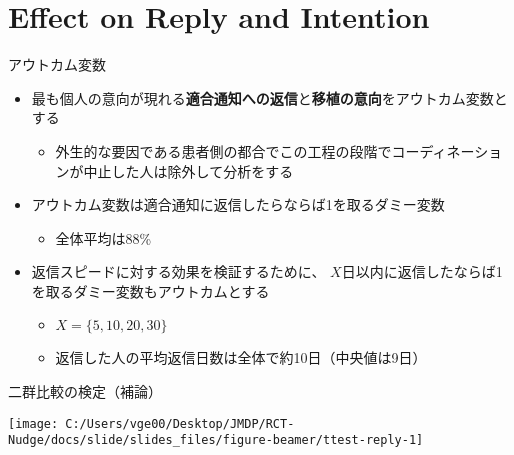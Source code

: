 \documentclass[
      aspectratio=169,
        12pt,
    ]{beamer}
\renewcommand{\textbf}[1]{{\color{DarkBlue}\bfseries#1}}
\providecommand{\tightlist}{%
  \setlength{\itemsep}{0pt}\setlength{\parskip}{0pt}}
\begin{document}
\hypertarget{effect-on-reply-and-intention}{%
\section{Effect on Reply and Intention}\label{effect-on-reply-and-intention}}

\begin{frame}{アウトカム変数}
\protect\hypertarget{ux30a2ux30a6ux30c8ux30abux30e0ux5909ux6570}{}
\begin{itemize}
\tightlist
\item
  最も個人の意向が現れる\textbf{適合通知への返信}と\textbf{移植の意向}をアウトカム変数とする

  \begin{itemize}
  \tightlist
  \item
    外生的な要因である患者側の都合でこの工程の段階でコーディネーションが中止した人は除外して分析をする
  \end{itemize}
\item
  アウトカム変数は適合通知に返信したらならば1を取るダミー変数

  \begin{itemize}
  \tightlist
  \item
    全体平均は88\%
  \end{itemize}
\item
  返信スピードに対する効果を検証するために、
  \(X\)日以内に返信したならば1を取るダミー変数もアウトカムとする

  \begin{itemize}
  \tightlist
  \item
    \(X = \{5, 10, 20, 30\}\)
  \item
    返信した人の平均返信日数は全体で約10日（中央値は9日）
  \end{itemize}
\end{itemize}
\end{frame}

\begin{frame}{二群比較の検定（補論）}
\protect\hypertarget{ux4e8cux7fa4ux6bd4ux8f03ux306eux691cux5b9aux88dcux8ad6}{}
\begin{center}\texttt{[image: C:/Users/vge00/Desktop/JMDP/RCT-Nudge/docs/slide/slides\_files/figure-beamer/ttest-reply-1]} \end{center}
\end{frame}
\end{document}
